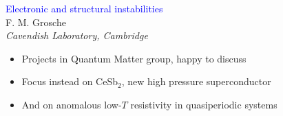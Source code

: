 \begin{emptyframe}
\begin{center}
\textcolor{Blue}{Electronic and structural instabilities} \\
\vspace{0.5em}
{\footnotesize F. M. Grosche} \\
{\footnotesize \em Cavendish Laboratory, Cambridge} \\
\vspace{0.1em}
\end{center}
\vspace{0.0em}

\begin{itemize}
    \item<1-> Projects in Quantum Matter group, happy to discuss
    \item<2-> Focus instead on CeSb$_2$, new high pressure superconductor
    \item<3-> And on anomalous low-$T$ resistivity in quasiperiodic systems
\end{itemize}
\end{emptyframe}



